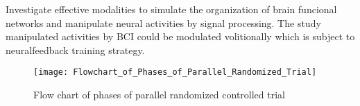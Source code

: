 \documentclass{article}
\begin{document}
Investigate effective modalities to simulate the organization 
of brain funcional networks and manipulate neural activities by 
signal processing. The study manipulated activities by BCI 
could be modulated volitionally which is subject to neuralfeedback training 
strategy.

\begin{figure}[!ht]
	\texttt{[image: Flowchart\_of\_Phases\_of\_Parallel\_Randomized\_Trial]}
	\centering
    \caption{Flow chart of phases of parallel randomized controlled trial}
    \label{fig:RCT}
\end{figure}

\printbibliography
\end{document}

